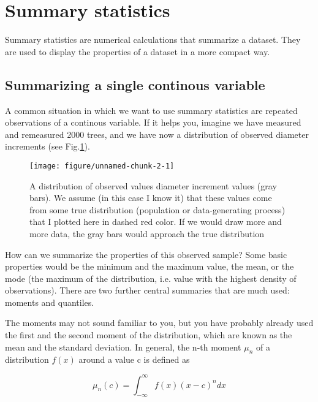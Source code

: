 \documentclass[a4paper,twoside]{tufte-book}\usepackage[]{graphicx}\usepackage[]{color}
\makeatletter
\def\maxwidth{ %
  \ifdim\Gin@nat@width>\linewidth
    \linewidth
  \else
    \Gin@nat@width
  \fi
}
\makeatother
\begin{document}
\section{Summary statistics}

Summary statistics are numerical calculations that summarize a dataset. They are used to display the properties of a dataset in a more compact way. 

\subsection{Summarizing a single continous variable}

A common situation in which we want to use summary statistics are repeated observations of a continous variable. If it helps you, imagine we have measured and remeasured 2000 trees, and we have now a distribution of observed diameter increments (see Fig.\ref{fig: data distribution}).

\begin{figure}[htbp]
\begin{center}
\begin{Schunk}

\texttt{[image: figure/unnamed-chunk-2-1]} \end{Schunk}
\caption{A distribution of observed values diameter increment values (gray bars). We assume (in this case I know it) that these values come from some true distribution (population or data-generating process) that I plotted here in dashed red color. If we would draw more and more data, the gray bars would approach the true distribution}
\label{fig: data distribution}
\end{center}
\end{figure}

How can we summarize the properties of this observed sample? Some basic properties would be the minimum and the maximum value, the mean, or the mode (the maximum of the distribution, i.e. value with the highest density of observations). There are two further central summaries that are much used: moments and quantiles.

The moments may not sound familiar to you, but you have probably already used the first and the second moment of the distribution, which are known as the mean and the standard deviation. In general, the n-th moment $\mu_n$ of a distribution $f(x)$ around a value c is defined as 

\begin{equation}
\mu_n(c) = \int_{-\infty}^{\infty} f(x) (x - c)^n dx
\end{equation}
\end{document}
